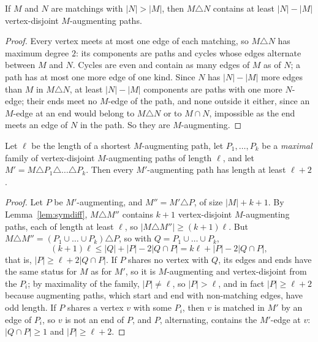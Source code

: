 \begin{lemma}\label{lem:symdiff}
If $M$ and $N$ are matchings with $|N|>|M|$, then $M\triangle N$ contains at least $|N|-|M|$ vertex-disjoint $M$-augmenting paths.
\end{lemma}
\begin{proof}
Every vertex meets at most one edge of each matching, so $M\triangle N$ has maximum degree $2$: its components are paths and cycles whose edges alternate between $M$ and $N$. Cycles are even and contain as many edges of $M$ as of $N$;
a path has at most one more edge of one kind. Since $N$ has $|N|-|M|$ more edges than $M$ in $M\triangle N$, at least $|N|-|M|$ components are paths with one more $N$-edge; their ends meet no $M$-edge of the path, and none outside it either,
since an $M$-edge at an end would belong to $M\triangle N$ or to $M\cap N$, impossible as the end meets an edge of $N$ in the path. So they are $M$-augmenting.
\end{proof}

\begin{lemma}\label{lem:hkphase}
Let $\ell$ be the length of a shortest $M$-augmenting path, let $P_1,\dots,P_k$ be a \emph{maximal} family of vertex-disjoint $M$-augmenting paths of length $\ell$, and let $M'=M\triangle P_1\triangle\dots\triangle P_k$. Then every $M'$-augmenting path has length
at least $\ell+2$.
\end{lemma}
\begin{proof}
Let $P$ be $M'$-augmenting, and $M''=M'\triangle P$, of size $|M|+k+1$. By Lemma~\ref{lem:symdiff}, $M\triangle M''$ contains $k+1$ vertex-disjoint $M$-augmenting paths, each of length at least $\ell$, so $|M\triangle M''|\ge(k+1)\ell$. But
$M\triangle M''=(P_1\cup\dots\cup P_k)\triangle P$, so with $Q=P_1\cup\dots\cup P_k$,
\[
(k+1)\ell\le|Q|+|P|-2|Q\cap P|=k\ell+|P|-2|Q\cap P|,
\]
that is, $|P|\ge\ell+2|Q\cap P|$. If $P$ shares no vertex with $Q$, its edges and ends have the same status for $M$ as for $M'$, so it is $M$-augmenting and vertex-disjoint from the $P_i$; by maximality of the family, $|P|\ne\ell$, so $|P|>\ell$, and in fact
$|P|\ge\ell+2$ because augmenting paths, which start and end with non-matching edges, have odd length. If $P$ shares a vertex $v$ with some $P_i$, then $v$ is matched in $M'$ by an edge of $P_i$, so $v$ is not an end of $P$,
and $P$, alternating, contains the $M'$-edge at $v$: $|Q\cap P|\ge1$ and $|P|\ge\ell+2$.
\end{proof}

